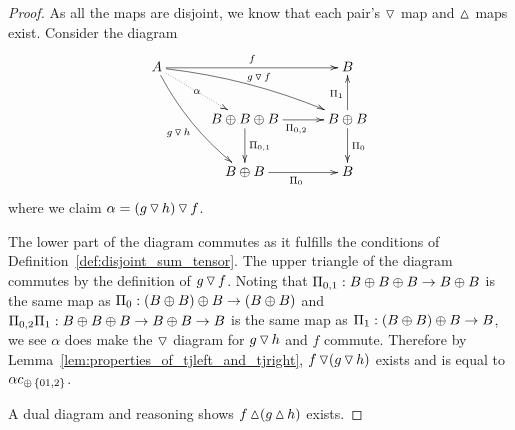 \begin{proof}
  As all the maps are disjoint, we know that each pair's $\operatorname{\triangledown}$ map and $\operatorname{\vartriangle}$ maps
  exist.  Consider the diagram
  \[
    \xymatrix@C+5pt{
      A \ar@/_/[ddr]_{g\tjleft h} \ar@/^/[drr]^{g\tjleft f} \ar@{.>}[dr]|-{\alpha} \ar[rr]^{f}
        & & B \\
        & B\+B\+B \ar[d]^{\Pi_{0,1}} \ar[r]_{\Pi_{0,2}} & B\+B \ar[d]^{\Pi_0} \ar[u]^{\Pi_1} \\
        & B\+B \ar[r]_{\Pi_0} & B
    }
  \]
  where we claim $\alpha = (g\operatorname{\triangledown} h)\operatorname{\triangledown} f$.

  The lower part of the diagram commutes as it fulfills the conditions of
  Definition~\ref{def:disjoint_sum_tensor}. The upper triangle of the diagram commutes by the
  definition of $g\operatorname{\triangledown} f$. Noting that $\Pi_{0,1}:B\oplus B\oplus B \to B\oplus B$ is the same map as
  $\Pi_0:(B\oplus B)\oplus B\to (B\oplus B)$ and $\Pi_{0,2} \Pi_1:B\oplus B\oplus B \to B\oplus B \to B$ is the same map as
  $\Pi_1:(B\oplus B)\oplus B\to B$, we see $\alpha$ does make the $\operatorname{\triangledown}$ diagram for $g\operatorname{\triangledown} h$ and $f$
  commute. Therefore by Lemma~\ref{lem:properties_of_tjleft_and_tjright}, $f\operatorname{\triangledown}(g\operatorname{\triangledown} h)$
  exists and is equal to $\alpha c_{\oplus\,\{01,2\}}$.

  A dual diagram and reasoning shows $f\operatorname{\vartriangle}(g\operatorname{\vartriangle} h)$ exists.
\end{proof}


